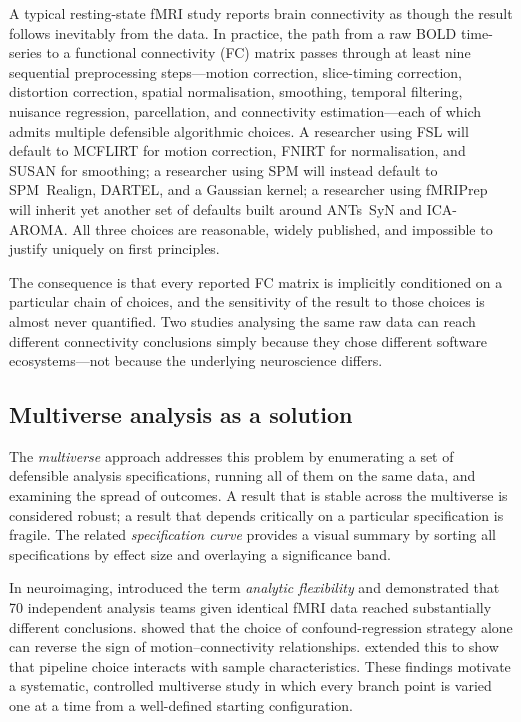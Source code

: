 \documentclass[11pt,a4paper]{article}
\begin{document}
A typical resting-state fMRI study reports brain connectivity as though the result follows inevitably from the data.  In practice, the path from a raw BOLD time-series to a functional connectivity (FC) matrix passes through at least nine sequential preprocessing steps---motion correction, slice-timing correction, distortion correction, spatial normalisation, smoothing, temporal filtering, nuisance regression, parcellation, and connectivity estimation---each of which admits multiple defensible algorithmic choices.  A researcher using FSL will default to MCFLIRT for motion correction, FNIRT for normalisation, and SUSAN for smoothing; a researcher using SPM will instead default to SPM~Realign, DARTEL, and a Gaussian kernel; a researcher using fMRIPrep will inherit yet another set of defaults built around ANTs~SyN and ICA-AROMA.  All three choices are reasonable, widely published, and impossible to justify uniquely on first principles.

The consequence is that every reported FC matrix is implicitly conditioned on a particular chain of choices, and the sensitivity of the result to those choices is almost never quantified.  Two studies analysing the same raw data can reach different connectivity conclusions simply because they chose different software ecosystems---not because the underlying neuroscience differs.

\subsection{Multiverse analysis as a solution}

The \emph{multiverse} approach \citep{steegen2016} addresses this problem by enumerating a set of defensible analysis specifications, running all of them on the same data, and examining the spread of outcomes.  A result that is stable across the multiverse is considered robust; a result that depends critically on a particular specification is fragile.  The related \emph{specification curve} \citep{simonsohn2020} provides a visual summary by sorting all specifications by effect size and overlaying a significance band.

In neuroimaging, \citet{botvinik2020} introduced the term \emph{analytic flexibility} and demonstrated that 70 independent analysis teams given identical fMRI data reached substantially different conclusions.  \citet{ciric2017} showed that the choice of confound-regression strategy alone can reverse the sign of motion--connectivity relationships.  \citet{parkes2018} extended this to show that pipeline choice interacts with sample characteristics.  These findings motivate a systematic, controlled multiverse study in which every branch point is varied one at a time from a well-defined starting configuration.
\end{document}
